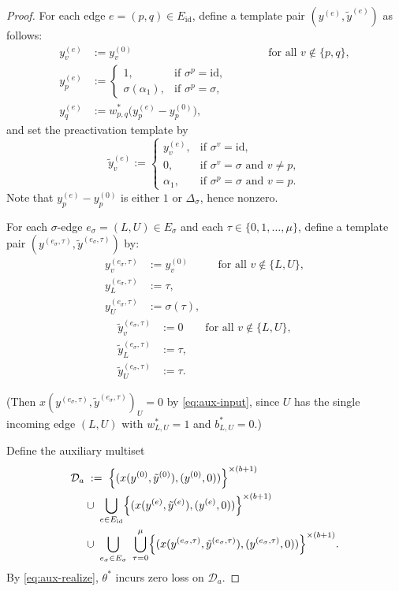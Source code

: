 \documentclass{article}
\newcommand{\cD}{\mathcal{D}}
\theoremstyle{plain}
\theoremstyle{definition}
\theoremstyle{remark}
\begin{document}
\begin{proof}
\smallskip
For each edge $e=(p,q)\in E_{\mathrm{id}}$, define a template pair $(y^{(e)},\tilde y^{(e)})$ as follows:
\[
\begin{aligned}
	y^{(e)}_v &:= y^{(0)}_v \qquad &&\text{for all } v\notin\{p,q\},\\
	y^{(e)}_p &:= 
	\begin{cases}
		1, & \text{if }\sigma^p=\mathrm{id},\\
		\sigma(\alpha_1), & \text{if }\sigma^p=\sigma,
	\end{cases}
	\qquad &&\\
	y^{(e)}_q &:= w^\ast_{p,q}\bigl(y^{(e)}_p - y^{(0)}_p\bigr), \qquad &&
\end{aligned}
\]
and set the preactivation template by
\[
\tilde y^{(e)}_v :=
\begin{cases}
	y^{(e)}_v, & \text{if }\sigma^v=\mathrm{id},\\
	0, & \text{if }\sigma^v=\sigma \text{ and } v\neq p,\\
	\alpha_1, & \text{if }\sigma^p=\sigma \text{ and } v=p.
\end{cases}
\]
Note that $y^{(e)}_p-y^{(0)}_p$ is either $1$ or $\Delta_\sigma$, hence nonzero.

For each $\sigma$-edge $e_\sigma=(L,U)\in E_\sigma$ and each $\tau\in\{0,1,\dots,\mu\}$, define a template pair $(y^{(e_\sigma,\tau)},\tilde y^{(e_\sigma,\tau)})$ by:
\[
\begin{aligned}
	y^{(e_\sigma,\tau)}_v &:= y^{(0)}_v &&\text{for all } v\notin\{L,U\},\\
	y^{(e_\sigma,\tau)}_L &:= \tau,\\
	y^{(e_\sigma,\tau)}_U &:= \sigma(\tau),
\end{aligned}
\]
\[
\begin{aligned}
	\tilde y^{(e_\sigma,\tau)}_v &:= 0 &&\text{for all } v\notin\{L,U\},\\
	\tilde y^{(e_\sigma,\tau)}_L &:= \tau,\\
	\tilde y^{(e_\sigma,\tau)}_U &:= \tau.
\end{aligned}
\]

(Then $x(y^{(e_\sigma,\tau)},\tilde y^{(e_\sigma,\tau)})_U=0$ by \eqref{eq:aux-input}, since $U$ has the single incoming edge $(L,U)$ with
$w^\ast_{L,U}=1$ and $b^\ast_{L,U}=0$.)

\smallskip
Define the auxiliary multiset
\[
\begin{aligned}
	\cD_a &\;:=\;
	\Bigl\{(x(y^{(0)},\tilde y^{(0)}),(y^{(0)},0))\Bigr\}^{\times(b+1)}
	\\
	&\cup\;
	\bigcup_{e\in E_{\mathrm{id}}}
	\Bigl\{(x(y^{(e)},\tilde y^{(e)}),(y^{(e)},0))\Bigr\}^{\times(b+1)}
	\\
	&\cup\;
	\bigcup_{e_\sigma\in E_{\sigma}}\ \bigcup_{\tau=0}^{\mu}
	\Bigl\{(x(y^{(e_\sigma,\tau)},\tilde y^{(e_\sigma,\tau)}),(y^{(e_\sigma,\tau)},0))\Bigr\}^{\times(b+1)}.
\end{aligned}
\]
By \eqref{eq:aux-realize}, $\theta^\ast$ incurs zero loss on $\cD_a$.


\end{proof}
\end{document}
